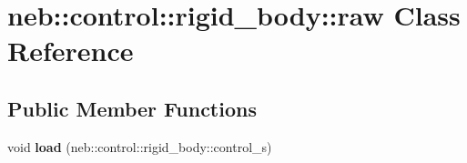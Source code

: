 \hypertarget{classneb_1_1control_1_1rigid__body_1_1raw}{\section{neb\-:\-:control\-:\-:rigid\-\_\-body\-:\-:raw \-Class \-Reference}
\label{classneb_1_1control_1_1rigid__body_1_1raw}
}
\subsection*{\-Public \-Member \-Functions}
\begin{DoxyCompactItemize}
\item 
\hypertarget{classneb_1_1control_1_1rigid__body_1_1raw_a79de740ae20967e3e3e3139c85766f41}{void {\bfseries load} (neb\-::control\-::rigid\-\_\-body\-::control\-\_\-s)}\label{classneb_1_1control_1_1rigid__body_1_1raw_a79de740ae20967e3e3e3139c85766f41}

\end{DoxyCompactItemize}
